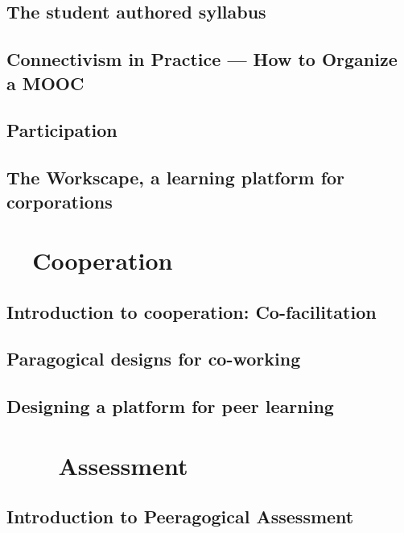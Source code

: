 \documentclass[ebook, 12pt, twoside]{memoir}
\begin{document}
\chapter[\textbf{The student authored syllabus}]{ The student authored syllabus } 
%

%
\chapter[\textbf{How to Organize a MOOC}]{ Connectivism in Practice ---  How to Organize a MOOC}
%

%
\chapter[\textbf{Participation}]{ Participation }
%

%
\chapter[\textbf{The Workscape}]{ The Workscape, a learning platform for corporations }
%



\part{~~Cooperation} %
%
\chapter[\textbf{Co-facilitation}]{Introduction to cooperation: Co-facilitation}

%
\chapter[\textbf{Designs for co-working}]{Paragogical designs for co-working}
%

%
\chapter[\textbf{Platform design}]{Designing a platform for peer learning}
%




\part{~~~~Assessment} %
%
\chapter[\textbf{Peeragogical Assessment}]{Introduction to Peeragogical Assessment}

%
\end{document}
